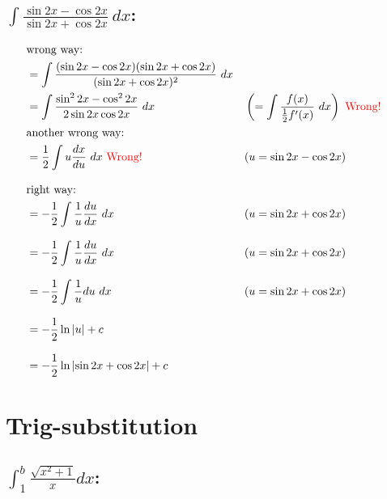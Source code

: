 \documentclass[MathsNotesBase.tex]{subfiles}
\begin{document}
  
  \subsection*{$\int{\frac{\sin{2x} - \cos{2x}}{\sin{2x} + \cos{2x}}}\ dx$:}
   
  \begin{align*}
    &\text{wrong way:} \\
    &= \int{\frac{ (\sin{2x} - \cos{2x})(\sin{2x} + \cos{2x}) }{ (\sin{2x} + \cos{2x})^2 }\ dx} \\
    &= \int{\frac{ \sin^2{2x} - \cos^2{2x} }{ 2\sin{2x}\cos{2x} }\ dx} &&\left(=\int{\frac{f(x)}{\frac{1}{2}f'(x)}\ dx}\right)\ \wrong \\
    &\text{another wrong way:} \\
    &= \frac{1}{2}\int{u\frac{dx}{du}\ dx}\ \wrong &&(u = \sin{2x} - \cos{2x}) \\[8pt]
    &\text{right way:} \\
    &= -\frac{1}{2}\int{\frac{1}{u}\frac{du}{dx}\ dx} &&(u = \sin{2x} + \cos{2x}) \\[8pt]
    &= -\frac{1}{2}\int{\frac{1}{u}\frac{du}{dx}\ dx} &&(u = \sin{2x} + \cos{2x}) \\[8pt]
    &= -\frac{1}{2}\int{\frac{1}{u}du\ dx} &&(u = \sin{2x} + \cos{2x}) \\[8pt]
    &= -\frac{1}{2}\ln{\rvert{u}\lvert} + c \\[8pt]
    &= -\frac{1}{2}\ln{\rvert{\sin{2x} + \cos{2x}}\lvert} + c \\
  \end{align*}

\bigskip
\bigskip
\bigskip
\bigskip

\section*{Trig-substitution}
\bigskip

  \subsection*{$\int_1^b{\frac{\sqrt{x^2 + 1}}{x}}dx$:}
   
\end{document}
